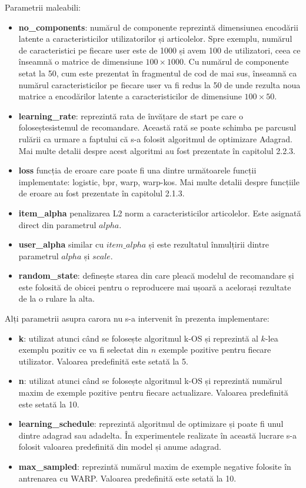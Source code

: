 Parametrii maleabili:
\begin{itemize}
  \item \textbf{no\_components}: numărul de componente reprezintă dimensiunea encodării latente a caracteristicilor utilizatorilor și articolelor. Spre exemplu, numărul de caracteristici pe fiecare user este de 1000 și avem 100 de utilizatori, ceea ce înseamnă o matrice de dimensiune $100 \times 1000$. Cu numărul de componente setat la 50, cum este prezentat în fragmentul de cod de mai sus, înseamnă ca numărul caracteristicilor pe fiecare user va fi redus la 50 de unde rezulta noua matrice a encodărilor latente a caracteristicilor de dimensiune $100 \times 50$.
  \item \textbf{learning\_rate}: reprezintă rata de învățare de start pe care o foloseștesistemul de recomandare. Această rată se poate schimba pe parcusul rulării ca urmare a faptului că s-a folosit algoritmul de optimizare Adagrad. Mai multe detalii despre acest algoritmi au fost prezentate în capitolul 2.2.3.
  \item \textbf{loss} funcția de eroare care poate fi una dintre următoarele funcții implementate: logistic, bpr, warp, warp-kos. Mai multe detalii despre funcțiile de eroare au fost prezentate în capitolul 2.1.3.
  \item \textbf{item\_alpha} penalizarea L2 norm a caracteristicilor articolelor. Este asignată direct din parametrul $alpha$.
  \item \textbf{user\_alpha} similar cu $item\_alpha$ și este rezultatul înmulțirii dintre parametrul $alpha$ și $scale$.
  \item \textbf{random\_state}: definește starea din care pleacă modelul de recomandare și este folosită de obicei pentru o reproducere mai ușoară a acelorași rezultate de la o rulare la alta.
\end{itemize}

Alți parametrii asupra carora nu s-a intervenit în prezenta implementare:
\begin{itemize}
	\item \textbf{k}: utilizat atunci când se folosește algoritmul k-OS și reprezintă al $k$-lea exemplu pozitiv ce va fi selectat din $n$ exemple pozitive pentru fiecare utilizator. Valoarea predefinită este setată la 5.
	\item \textbf{n}: utilizat atunci când se folosește algoritmul k-OS și reprezintă numărul maxim de exemple pozitive pentru fiecare actualizare. Valoarea predefinită este setată la 10.
	\item \textbf{learning\_schedule}: reprezintă algoritmul de optimizare și poate fi unul dintre adagrad sau adadelta. În experimentele realizate în această lucrare s-a folosit valoarea predefinită din model și anume adagrad.
	\item \textbf{max\_sampled}: reprezintă numărul maxim de exemple negative folosite în antrenarea cu WARP. Valoarea predefinită este setată la 10.
\end{itemize}

